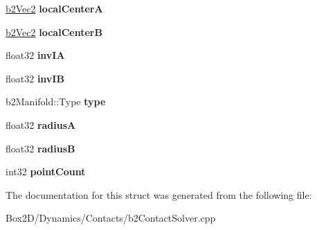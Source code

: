 \begin{DoxyCompactItemize}
\mbox{\label{structb2_contact_position_constraint_a3c0ff098c54e3c3bfed4470c4f62c4ee}} 
\hyperlink{structb2_vec2}{b2\+Vec2} {\bfseries local\+CenterA}
\item 
\mbox{\label{structb2_contact_position_constraint_acf14c9cfcf37ae1c89d0e4bc6c2d3ac2}} 
\hyperlink{structb2_vec2}{b2\+Vec2} {\bfseries local\+CenterB}
\item 
\mbox{\label{structb2_contact_position_constraint_aaf92ebfd9ee6f7734199e7cf65441fdb}} 
float32 {\bfseries inv\+IA}
\item 
\mbox{\label{structb2_contact_position_constraint_a942566765748c8daf934a051457f4b0f}} 
float32 {\bfseries inv\+IB}
\item 
\mbox{\label{structb2_contact_position_constraint_a09f96db1c3fe5ede24395e2431e95103}} 
b2\+Manifold\+::\+Type {\bfseries type}
\item 
\mbox{\label{structb2_contact_position_constraint_ae75232327a6d37b0c36c2a8e12ef08b2}} 
float32 {\bfseries radiusA}
\item 
\mbox{\label{structb2_contact_position_constraint_a066db66f0b944b92c2666271e88e4540}} 
float32 {\bfseries radiusB}
\item 
\mbox{\label{structb2_contact_position_constraint_a98c9f0e1e7041ed2b15370ed713b84fc}} 
int32 {\bfseries point\+Count}
\end{DoxyCompactItemize}


The documentation for this struct was generated from the following file\+:\begin{DoxyCompactItemize}
\item 
Box2\+D/\+Dynamics/\+Contacts/b2\+Contact\+Solver.\+cpp\end{DoxyCompactItemize}
